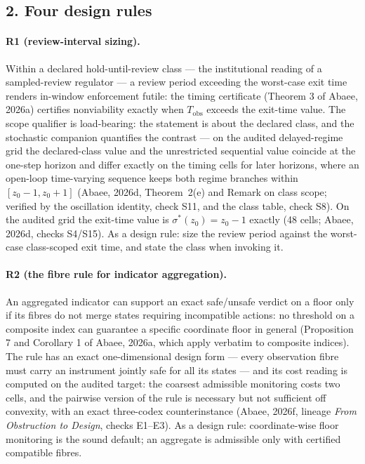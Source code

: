 \documentclass[10pt,twocolumn]{article}
\theoremstyle{definition}
\begin{document}
\subsection{2. Four design rules}\label{rules}

\paragraph{R1 (review-interval sizing).}
Within a declared hold-until-review class --- the institutional reading of
a sampled-review regulator --- a review period exceeding the worst-case
exit time renders in-window enforcement futile: the timing certificate
(Theorem 3 of Abaee, 2026a) certifies nonviability exactly when
\(T_{\mathrm{obs}}\) exceeds the exit-time value. The scope qualifier is
load-bearing: the statement is about the declared class, and the
stochastic companion quantifies the contrast --- on the audited
delayed-regime grid the declared-class value and the unrestricted
sequential value coincide at the one-step horizon and differ exactly on
the timing cells for later horizons, where an open-loop time-varying
sequence keeps both regime branches within \([z_{0}-1, z_{0}+1]\)
(Abaee, 2026d, Theorem~2(e) and Remark on class scope; verified by the
oscillation identity, check S11, and the class table, check S8). On the
audited grid the exit-time value is \(\sigma^{*}(z_{0}) = z_{0} - 1\)
exactly (48 cells; Abaee, 2026d, checks S4/S15). As a design rule: size
the review period against the worst-case class-scoped exit time, and
state the class when invoking it.

\paragraph{R2 (the fibre rule for indicator aggregation).}
An aggregated indicator can support an exact safe/unsafe verdict on a
floor only if its fibres do not merge states requiring incompatible
actions: no threshold on a composite index can guarantee a specific
coordinate floor in general (Proposition 7 and Corollary 1 of Abaee,
2026a, which apply verbatim to composite indices). The rule has an exact
one-dimensional design form --- every observation fibre must carry an
instrument jointly safe for all its states --- and its cost reading is
computed on the audited target: the coarsest admissible monitoring costs
two cells, and the pairwise version of the rule is necessary but not
sufficient off convexity, with an exact three-codex counterinstance
(Abaee, 2026f, lineage \emph{From Obstruction to Design}, checks E1--E3). As a
design rule: coordinate-wise floor monitoring is the sound default; an
aggregate is admissible only with certified compatible fibres.
\end{document}
